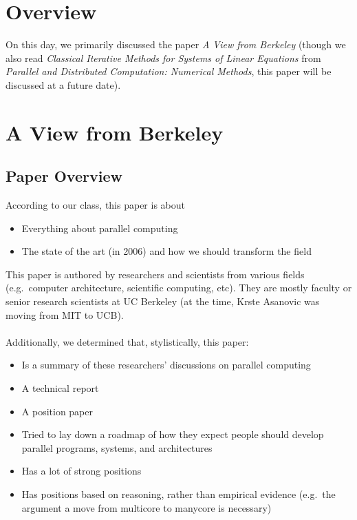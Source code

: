 



\section{Overview}\label{feb-11:overview}
On this day, we primarily discussed the paper \textit{A View from Berkeley}\cite{Asanovic:EECS-2006-183} (though we also read \textit{Classical Iterative Methods for Systems of Linear Equations} from \textit{Parallel and Distributed Computation: Numerical Methods}\cite{Bertsekas:1989:PDC:59912}, this paper will be discussed at a future date).

\section{A View from Berkeley}\label{feb-11:a-view}
\subsection{Paper Overview}\label{feb-11:a-view:overview}
According to our class, this paper is about
\begin{itemize}
    \item Everything about parallel computing
    \item The state of the art (in 2006) and how we should transform the field
\end{itemize}
This paper is authored by researchers and scientists from various fields (e.g.\ computer architecture, scientific computing, etc).
They are mostly faculty or senior research scientists at UC Berkeley (at the time, Krste Asanovic was moving from MIT to UCB).
\\ \\
Additionally, we determined that, stylistically, this paper:
\begin{itemize}
    \item Is a summary of these researchers' discussions on parallel computing
    \item A technical report
    \item A position paper
    \item Tried to lay down a roadmap of how they expect people should develop parallel programs, systems, and architectures
    \item Has a lot of strong positions
    \item Has positions based on reasoning, rather than empirical evidence (e.g.\ the argument a move from multicore to manycore is necessary)
\end{itemize}

